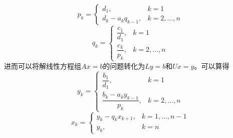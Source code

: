 \documentclass[UTF8,a4paper,10pt]{ctexart}
\begin{document}
                $$
                p_k=
                    \begin{cases}
                        d_1,&k=1 \\
                        d_k-a_kq_{k-1},&k=2,\dots,n
                    \end{cases}
                $$
                $$
                q_k=
                    \begin{cases}
                        \dfrac{c_1}{d_1},&k=1 \\
                        \dfrac{c_k}{p_k},&k=2,\dots,n
                    \end{cases}
                $$
                进而可以将解线性方程组$Ax=b$的问题转化为$Ly=b$和$Ux=y$。可以算得
                $$
                y_k=
                    \begin{cases}
                        \dfrac{b_1}{d_1},&k=1 \\
                        \dfrac{b_k-a_ky_{k-1}}{p_k},&k=2,\dots,n
                    \end{cases}
                $$
                $$
                x_k=
                    \begin{cases}
                        y_k-q_kx_{k+1},&k=1,\dots,n-1 \\
                        y_k,&k=n
                    \end{cases}
                $$
\end{document}
